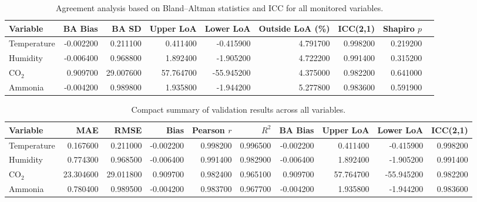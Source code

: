 \begin{table}
\caption{Agreement analysis based on Bland--Altman statistics and ICC for all monitored variables.}
\label{tab:agreement_metrics}
\begin{tabular}{lrrrrrrrr}
\toprule
Variable & BA Bias & BA SD & Upper LoA & Lower LoA & Outside LoA (\%) & ICC(2,1) & Shapiro $p$ \\
\midrule
Temperature & -0.002200 & 0.211100 & 0.411400 & -0.415900 & 4.791700 & 0.998200 & 0.219200 \\
Humidity & -0.006400 & 0.968800 & 1.892400 & -1.905200 & 4.722200 & 0.991400 & 0.315200 \\
CO$_2$ & 0.909700 & 29.007600 & 57.764700 & -55.945200 & 4.375000 & 0.982200 & 0.641000 \\
Ammonia & -0.004200 & 0.989800 & 1.935800 & -1.944200 & 5.277800 & 0.983600 & 0.591900 \\
\bottomrule
\end{tabular}
\end{table}


\begin{table}
\caption{Compact summary of validation results across all variables.}
\label{tab:validation_summary}
\begin{tabular}{lrrrrrrrrr}
\toprule
Variable & MAE & RMSE & Bias & Pearson $r$ & $R^2$ & BA Bias & Upper LoA & Lower LoA & ICC(2,1) \\
\midrule
Temperature & 0.167600 & 0.211000 & -0.002200 & 0.998200 & 0.996500 & -0.002200 & 0.411400 & -0.415900 & 0.998200 \\
Humidity & 0.774300 & 0.968500 & -0.006400 & 0.991400 & 0.982900 & -0.006400 & 1.892400 & -1.905200 & 0.991400 \\
CO$_2$ & 23.304600 & 29.011800 & 0.909700 & 0.982400 & 0.965100 & 0.909700 & 57.764700 & -55.945200 & 0.982200 \\
Ammonia & 0.780400 & 0.989500 & -0.004200 & 0.983700 & 0.967700 & -0.004200 & 1.935800 & -1.944200 & 0.983600 \\
\bottomrule
\end{tabular}
\end{table}
